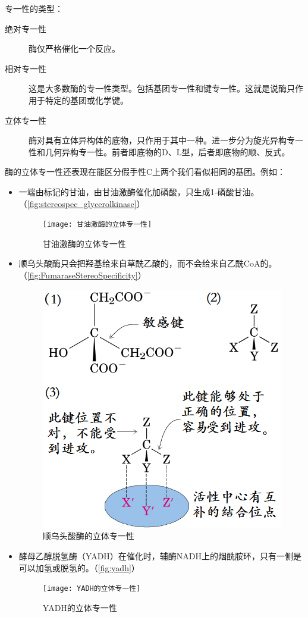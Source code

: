 专一性的类型：
\begin{description}
	\item[绝对专一性] 酶仅严格催化一个反应。
	\item[相对专一性] 这是大多数酶的专一性类型。包括基团专一性和键专一性。这就是说酶只作用于特定的基团或化学键。
	\item[立体专一性] 酶对具有立体异构体的底物，只作用于其中一种。进一步分为旋光异构专一性和几何异构专一性。前者即底物的D、L型，后者即底物的顺、反式。
\end{description}

酶的立体专一性还表现在能区分假手性C上两个我们看似相同的基团。例如：
\begin{itemize}
	\item 一端由标记的甘油，由甘油激酶催化加磷酸，只生成1-磷酸甘油。（\autoref{fig:stereospec_glycerolkinase}）

	\begin{figure}[htbp]
		\centering
		\texttt{[image: 甘油激酶的立体专一性]}
		\caption{甘油激酶的立体专一性}
		\label{fig:stereospec_glycerolkinase}
	\end{figure}

	\item 顺乌头酸酶只会把羟基给来自草酰乙酸的，而不会给来自乙酰CoA的。（\autoref{fig:FumaraseStereoSpecificity}）

	\begin{figure}[htbp]
		\centering
		\includegraphics[width=0.3\linewidth]{Pics/顺乌头酸酶的立体专一性}
		\caption{顺乌头酸酶的立体专一性}
		\label{fig:FumaraseStereoSpecificity}
	\end{figure}

	\item 酵母乙醇脱氢酶（YADH）在催化时，辅酶NADH上的烟酰胺环，只有一侧是可以加氢或脱氢的。（\autoref{fig:yadh}）

	\begin{figure}[htbp]
		\centering
		\texttt{[image: YADH的立体专一性]}
		\caption{YADH的立体专一性}
		\label{fig:yadh}
	\end{figure}

\end{itemize}

